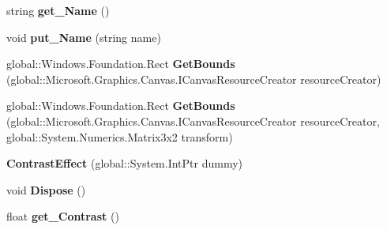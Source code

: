 \begin{DoxyCompactItemize}
string {\bfseries get\+\_\+\+Name} ()
\item 
\mbox{\label{class_microsoft_1_1_graphics_1_1_canvas_1_1_effects_1_1_contrast_effect_abc318b4aa26dee2333a52d0e70b53a88}} 
void {\bfseries put\+\_\+\+Name} (string name)
\item 
\mbox{\label{class_microsoft_1_1_graphics_1_1_canvas_1_1_effects_1_1_contrast_effect_a8d8d0baa90784d8ceef5e69730b00aa4}} 
global\+::\+Windows.\+Foundation.\+Rect {\bfseries Get\+Bounds} (global\+::\+Microsoft.\+Graphics.\+Canvas.\+I\+Canvas\+Resource\+Creator resource\+Creator)
\item 
\mbox{\label{class_microsoft_1_1_graphics_1_1_canvas_1_1_effects_1_1_contrast_effect_a7d7ad97626f28fed20870cf46f5910da}} 
global\+::\+Windows.\+Foundation.\+Rect {\bfseries Get\+Bounds} (global\+::\+Microsoft.\+Graphics.\+Canvas.\+I\+Canvas\+Resource\+Creator resource\+Creator, global\+::\+System.\+Numerics.\+Matrix3x2 transform)
\item 
\mbox{\label{class_microsoft_1_1_graphics_1_1_canvas_1_1_effects_1_1_contrast_effect_a8088c0c5b388e6b2ce8eeb3b08c3c7b0}} 
{\bfseries Contrast\+Effect} (global\+::\+System.\+Int\+Ptr dummy)
\item 
\mbox{\label{class_microsoft_1_1_graphics_1_1_canvas_1_1_effects_1_1_contrast_effect_a6f1bc711c2e2f43a2cdbf5f599a01945}} 
void {\bfseries Dispose} ()
\item 
\mbox{\label{class_microsoft_1_1_graphics_1_1_canvas_1_1_effects_1_1_contrast_effect_a140d08b77f0edc43a81972e67cc7bc4b}} 
float {\bfseries get\+\_\+\+Contrast} ()
\item 
\mbox{\label{class_microsoft_1_1_graphics_1_1_canvas_1_1_effects_1_1_contrast_effect_a23919ae56b418fe712468cc40f3e719a}} 

\end{DoxyCompactItemize}

